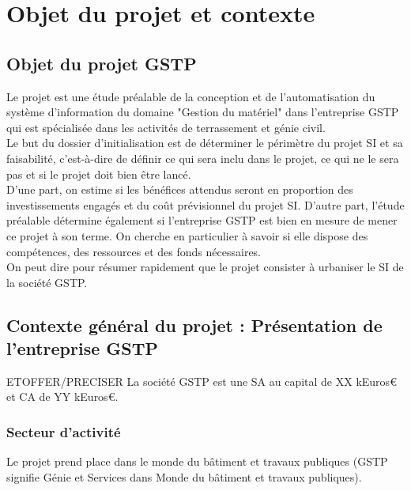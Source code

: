 \section{Objet du projet et contexte}

\subsection{Objet du projet GSTP}
Le projet est une étude préalable de la conception et de l'automatisation
du système d'information du domaine "Gestion du matériel" dans l'entreprise 
GSTP qui est spécialisée dans les activités de terrassement et génie civil.\\

Le but du dossier d'initialisation est de déterminer le périmètre du projet
SI et sa faisabilité, c’est-à-dire de définir ce qui sera inclu
dans le projet, ce qui ne le sera pas et si le projet doit bien être
lancé.\\

D’une part, on estime si les bénéfices attendus seront en proportion des
investissements engagés et du coût prévisionnel du projet SI.  D’autre
part, l’étude préalable détermine également si l’entreprise GSTP est
bien en mesure de mener ce projet à son terme. On cherche en particulier
à savoir si elle dispose des compétences, des ressources et des fonds
nécessaires.\\

On peut dire pour résumer rapidement que le projet consister à urbaniser le
SI de la société GSTP.


\subsection{Contexte général du projet : Présentation de l'entreprise GSTP}

ETOFFER/PRECISER
La société GSTP est une SA au capital de XX kEuros€ et CA de YY kEuros€.

\subsubsection{Secteur d'activité}
Le projet prend place dans le monde du bâtiment et travaux publiques (GSTP
signifie Génie et Services dans Monde du bâtiment et travaux publiques).


